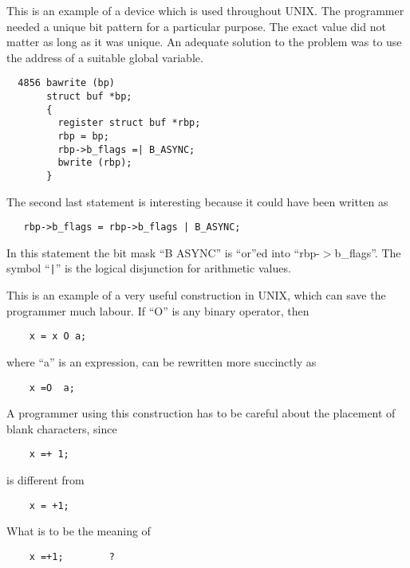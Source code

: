 This is an example of a device which is
used throughout UNIX. The programmer
needed a unique bit pattern for a particular purpose. The exact value did
not matter as long as it was unique.
An adequate solution to the problem was
to use the address of a suitable global
variable.


\begin{verbatim}
  4856 bawrite (bp)
       struct buf *bp;
       {
         register struct buf *rbp;
         rbp = bp;
         rbp->b_flags =| B_ASYNC;
         bwrite (rbp);
       }
\end{verbatim}

The second last statement is interesting because it could have been written
as

\begin{verbatim}
   rbp->b_flags = rbp->b_flags | B_ASYNC;
\end{verbatim}

In this statement the bit mask
``B ASYNC'' is ``or''ed into
``rbp-$>$b\_flags''. The symbol ``\verb+|+'' is the
logical disjunction for arithmetic
values.


This is an example of a very useful
construction in UNIX, which can save
the programmer much labour. If ``O'' is
any binary operator, then


\begin{verbatim}
    x = x O a;
\end{verbatim}

\noindent where ``a'' is an expression, can be
rewritten more succinctly as

\begin{verbatim}
    x =O  a;
\end{verbatim}

A programmer using this construction
has to be careful about the placement
of blank characters, since

\begin{verbatim}
    x =+ 1;
\end{verbatim}

\noindent is different from

\begin{verbatim}
    x = +1;
\end{verbatim}

\noindent What is to be the meaning of

\begin{verbatim}
    x =+1;        ?
\end{verbatim}

